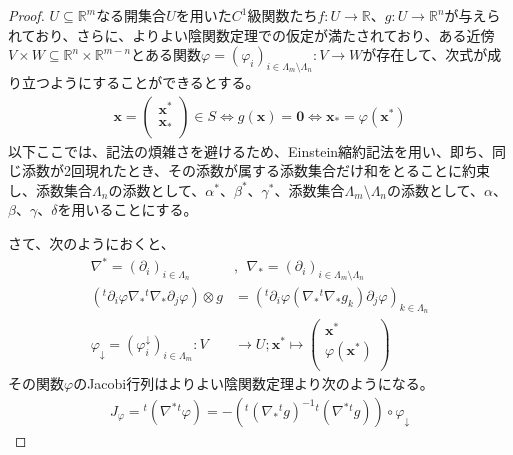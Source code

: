 \documentclass[dvipdfmx]{jsarticle}
\begin{document}
\begin{proof}
$U \subseteq \mathbb{R}^{m}$なる開集合$U$を用いた$C^{1}$級関数たち$f:U \rightarrow \mathbb{R}$、$g:U \rightarrow \mathbb{R}^{n}$が与えられており、さらに、よりよい陰関数定理での仮定が満たされており、ある近傍$V \times W \subseteq \mathbb{R}^{n} \times \mathbb{R}^{m - n}$とある関数$\varphi = \left( \varphi_{i} \right)_{i \in \varLambda_{m} \setminus \varLambda_{n}}:V \rightarrow W$が存在して、次式が成り立つようにすることができるとする。
\begin{align*}
\mathbf{x} = \begin{pmatrix}
\mathbf{x}^{*} \\
\mathbf{x}_{*} \\
\end{pmatrix} \in S \Leftrightarrow g\left( \mathbf{x} \right) = \mathbf{0} \Leftrightarrow \mathbf{x}_{*} = \varphi\left( \mathbf{x}^{*} \right)
\end{align*}
以下ここでは、記法の煩雑さを避けるため、Einstein縮約記法を用い、即ち、同じ添数が2回現れたとき、その添数が属する添数集合だけ和をとることに約束し、添数集合$\varLambda_{n}$の添数として、$\alpha^{*}$、$\beta^{*}$、$\gamma^{*}$、添数集合$\varLambda_{m} \setminus \varLambda_{n}$の添数として、$\alpha$、$\beta$、$\gamma$、$\delta$を用いることにする。\par
さて、次のようにおくと、
\begin{align*}
\nabla^{*} = \left( \partial_{i} \right)_{i \in \varLambda_{n}}&,\ \ \nabla_{*} = \left( \partial_{i} \right)_{i \in \varLambda_{m} \setminus \varLambda_{n}} \\
\left({}^t \partial_{i}\varphi\nabla_{*}{}^t \nabla_{*}\partial_{j}\varphi \right) \otimes g &= \left({}^t \partial_{i}\varphi\left( \nabla_{*}{}^t \nabla_{*}g_{k} \right)\partial_{j}\varphi \right)_{k \in \varLambda_{n}} \\
\varphi_{\downarrow} = \left( \varphi_{i}^{\downarrow} \right)_{i \in \varLambda_{m}}:V &\rightarrow U;\mathbf{x}^{*} \mapsto \begin{pmatrix}
\mathbf{x}^{*} \\
\varphi\left( \mathbf{x}^{*} \right) \\
\end{pmatrix}
\end{align*}
その関数$\varphi$のJacobi行列はよりよい陰関数定理より次のようになる。
\begin{align*}
J_{\varphi} ={}^t \left( \nabla^{*}{}^t \varphi \right) = - \left({}^t \left( \nabla_{*}{}^{t}g \right)^{- 1}{}^{t}\left( \nabla^{*}{}^t g \right) \right) \circ \varphi_{\downarrow}

\end{align*}
\end{proof}
\end{document}
